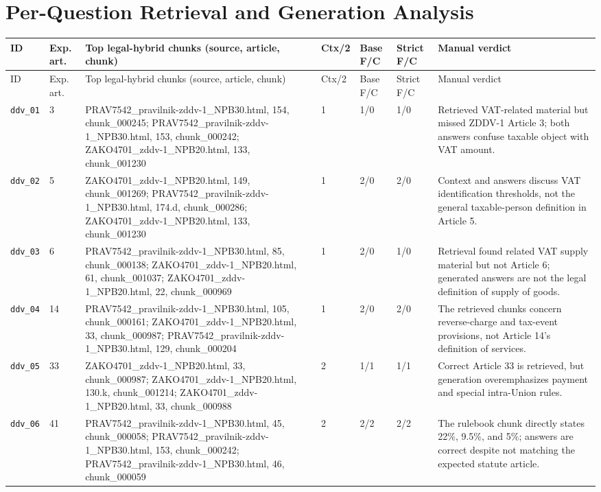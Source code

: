 \documentclass[11pt,a4paper]{article}
\begin{document}
\section{Per-Question Retrieval and Generation Analysis}
\begin{landscape}
\scriptsize
\begin{longtable}{p{1.7cm}p{1.2cm}p{6.0cm}p{1.3cm}p{1.4cm}p{1.4cm}p{6.0cm}}
\toprule
ID & Exp. art. & Top legal-hybrid chunks (source, article, chunk) & Ctx/2 & Base F/C & Strict F/C & Manual verdict \\
\midrule
\endfirsthead
\toprule
ID & Exp. art. & Top legal-hybrid chunks (source, article, chunk) & Ctx/2 & Base F/C & Strict F/C & Manual verdict \\
\midrule
\endhead
\texttt{ddv\_01} & 3 & PRAV7542\_pravilnik-zddv-1\_NPB30.html, 154, chunk\_000245; PRAV7542\_pravilnik-zddv-1\_NPB30.html, 153, chunk\_000242; ZAKO4701\_zddv-1\_NPB20.html, 133, chunk\_001230 & 1 & 1/0 & 1/0 & Retrieved VAT-related material but missed ZDDV-1 Article 3; both answers confuse taxable object with VAT amount. \\
\texttt{ddv\_02} & 5 & ZAKO4701\_zddv-1\_NPB20.html, 149, chunk\_001269; PRAV7542\_pravilnik-zddv-1\_NPB30.html, 174.d, chunk\_000286; ZAKO4701\_zddv-1\_NPB20.html, 133, chunk\_001230 & 1 & 2/0 & 2/0 & Context and answers discuss VAT identification thresholds, not the general taxable-person definition in Article 5. \\
\texttt{ddv\_03} & 6 & PRAV7542\_pravilnik-zddv-1\_NPB30.html, 85, chunk\_000138; ZAKO4701\_zddv-1\_NPB20.html, 61, chunk\_001037; ZAKO4701\_zddv-1\_NPB20.html, 22, chunk\_000969 & 1 & 2/0 & 1/0 & Retrieval found related VAT supply material but not Article 6; generated answers are not the legal definition of supply of goods. \\
\texttt{ddv\_04} & 14 & PRAV7542\_pravilnik-zddv-1\_NPB30.html, 105, chunk\_000161; ZAKO4701\_zddv-1\_NPB20.html, 33, chunk\_000987; PRAV7542\_pravilnik-zddv-1\_NPB30.html, 129, chunk\_000204 & 1 & 2/0 & 2/0 & The retrieved chunks concern reverse-charge and tax-event provisions, not Article 14's definition of services. \\
\texttt{ddv\_05} & 33 & ZAKO4701\_zddv-1\_NPB20.html, 33, chunk\_000987; ZAKO4701\_zddv-1\_NPB20.html, 130.k, chunk\_001214; ZAKO4701\_zddv-1\_NPB20.html, 33, chunk\_000988 & 2 & 1/1 & 1/1 & Correct Article 33 is retrieved, but generation overemphasizes payment and special intra-Union rules. \\
\texttt{ddv\_06} & 41 & PRAV7542\_pravilnik-zddv-1\_NPB30.html, 45, chunk\_000058; PRAV7542\_pravilnik-zddv-1\_NPB30.html, 153, chunk\_000242; PRAV7542\_pravilnik-zddv-1\_NPB30.html, 46, chunk\_000059 & 2 & 2/2 & 2/2 & The rulebook chunk directly states 22\%, 9.5\%, and 5\%; answers are correct despite not matching the expected statute article. \\

\end{longtable}
\end{landscape}
\end{document}
